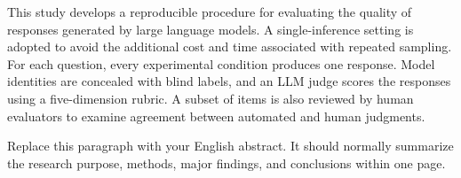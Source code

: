 \begin{englishabstract}
This study develops a reproducible procedure for evaluating the quality of responses generated by large language models. A single-inference setting is adopted to avoid the additional cost and time associated with repeated sampling. For each question, every experimental condition produces one response. Model identities are concealed with blind labels, and an LLM judge scores the responses using a five-dimension rubric. A subset of items is also reviewed by human evaluators to examine agreement between automated and human judgments.

Replace this paragraph with your English abstract. It should normally summarize the research purpose, methods, major findings, and conclusions within one page.

\enkeywordsfrommetadata
\end{englishabstract}

